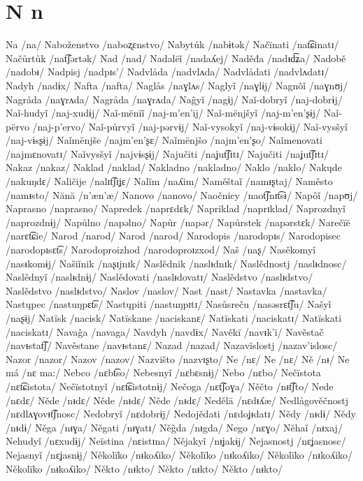 \chapter{N n}

Na /na/
Naboženstvo /naboʐɛnstvo/
Nabytůk /nabɨtək/
Načïnati /nat͡ɕinatɪ/
Načůrtůk /nat͡ʃərtək/
Nad /nad/
Nadalëǐ /nadaʎej/
Naděđa /nadᵻd͡ʑa/
Nadobě /nadobᵻ/
Nadpisj /nadpɪs’/
Nadvlåda /nadvlʌda/
Nadvlådati /nadvlʌdatɪ/
Nadyh /nadɨx/
Nafta /nafta/
Naglås /naɣlʌs/
Naglyǐ /naɣlɨj/
Nagnôǐ /naɣnʊj/
Nagråda /naɣrʌda/
Nagråda /naɣrʌda/
Naĝyǐ /nagɨj/
Naǐ-dobryǐ /naj-dobrɨj/
Naǐ-hudyǐ /naj-xudɨj/
Naǐ-mënïǐ /naj-m’en’ij/
Naǐ-mënjšyǐ /naj-m’en’ʂɨj/
Naǐ-përvo /naj-p’ervo/
Naǐ-půrvyǐ /naj-pərvɨj/
Naǐ-vysokyǐ /naj-vɨsokɨj/
Naǐ-vysšyǐ /naj-vɨsʂɨj/
Naǐmënjše /najm’en’ʂɛ/
Naǐmënjšo /najm’en’ʂo/
Naǐmenovati /najmɛnovatɪ/
Naǐvysšyǐ /najvɨsʂɨj/
Najučiti /naʝut͡ʃɪtɪ/
Najučiti /naʝut͡ʃɪtɪ/
Nakaz /nakaz/
Naklad /naklad/
Nakladno /nakladno/
Naklo /naklo/
Nakųde /nakuŋdɛ/
Naličije /nalɪt͡ʃɪʝɛ/
Nalïm /naʎim/
Naměštaǐ /namᵻʂtaj/
Naměsto /namᵻsto/
Nänä /n’æn’æ/
Nanovo /nanovo/
Naočnicy /naot͡ʃnɪt͡sɨ/
Napôǐ /napʊj/
Naprasno /naprasno/
Napredek /naprɛdɛk/
Napriklad /naprɪklad/
Naprozdnyǐ /naprozdnɨj/
Napůlno /napəlno/
Napůr /napər/
Napůrstek /napərstɛk/
Narečïë /narɛt͡ɕie/
Narod /narod/
Narod /narod/
Narodopis /narodopɪs/
Narodopisec /narodopɪsɛt͡s/
Narodoproizhod /narodoproɪzxod/
Naš /naʂ/
Nasěkomyǐ /nasᵻkomɨj/
Našiǐnik /naʂɪjnɪk/
Naslědnik /naslᵻdnɪk/
Naslědnostj /naslᵻdnosc/
Naslědnyǐ /naslᵻdnɨj/
Naslědovati /naslᵻdovatɪ/
Naslědstvo /naslᵻdstvo/
Naslědstvo /naslᵻdstvo/
Naslov /naslov/
Nast /nast/
Nastavka /nastavka/
Nastųpec /nastuŋpɛt͡s/
Nastųpiti /nastuŋpɪtɪ/
Nasůsreču /nasəsrɛt͡ʃu/
Našyǐ /naʂɨj/
Natïsk /nacisk/
Natïskane /naciskanɛ/
Natïskati /naciskatɪ/
Natïskati /naciskatɪ/
Navaĝa /navaga/
Navdyh /navdɨx/
Navěkï /navᵻk’i/
Navěstač /navᵻstat͡ʃ/
Navěstane /navᵻstanɛ/
Nazad /nazad/
Nazavïslostj /nazav’islosc/
Nazor /nazor/
Nazov /nazov/
Nazvišto /nazvɪʂto/
Ne /nɛ/
Ne /nɛ/
Ně /nᵻ/
Ne má /nɛ ma:/
Nebco /nɛbt͡so/
Nebesnyǐ /nɛbɛsnɨj/
Nebo /nɛbo/
Nečïstota /nɛt͡ɕistota/
Nečïstotnyǐ /nɛt͡ɕistotnɨj/
Nečoga /nɛt͡ʃoɣa/
Něčto /nᵻt͡ʃto/
Nede /nɛdɛ/
Něde /nᵻdɛ/
Něde /nᵻdɛ/
Něde /nᵻdɛ/
Nedělä /nɛdᵻʎæ/
Nedlågověčnostj /nɛdlʌɣovᵻt͡ʃnosc/
Nedobryǐ /nɛdobrɨj/
Nedojědati /nɛdoʝᵻdatɪ/
Nědy /nᵻdɨ/
Nědy /nᵻdɨ/
Něga /nᵻɣa/
Něgati /nᵻɣatɪ/
Něĝda /nᵻgda/
Nego /nɛɣo/
Něhaǐ /nᵻxaj/
Nehudyǐ /nɛxudɨj/
Neïstina /nɛistɪna/
Nějakyǐ /nᵻʝakɨj/
Nejasnostj /nɛʝasnosc/
Nejasnyǐ /nɛʝasnɨj/
Několïko /nᵻkoʎiko/
Několïko /nᵻkoʎiko/
Několïko /nᵻkoʎiko/
Několïko /nᵻkoʎiko/
Někto /nᵻkto/
Někto /nᵻkto/
Někto /nᵻkto/
